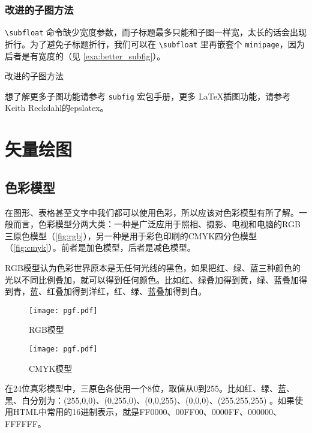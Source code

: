 \subsubsection{改进的子图方法}

\verb|\subfloat| 命令缺少宽度参数，而子标题最多只能和子图一样宽，太长的话会出现折行。为了避免子标题折行，我们可以在 \verb|\subfloat| 里再嵌套个 \texttt{minipage}，因为后者是有宽度的（见 \autoref{exa:better_subfig}）。

\begin{example}[h]
\caption{改进的子图方法}
\label{exa:better_subfig}
\end{example}

想了解更多子图功能请参考 \texttt{subfig} 宏包手册\citep{Cochran_2005}，更多 \LaTeX 插图功能，请参考Keith Reckdahl\indexReckdahl 的epslatex\citep{Reckdahl_2006}。

\section{矢量绘图}
\label{sec:draft}

\subsection{色彩模型}

在图形、表格甚至文字中我们都可以使用色彩，所以应该对色彩模型有所了解。一般而言，色彩模型分两大类：一种是广泛应用于照相、摄影、电视和电脑的RGB三原色模型（\autoref{fig:rgb}），另一种是用于彩色印刷的CMYK四分色模型（\autoref{fig:cmyk}）。前者是加色模型，后者是减色模型。

RGB模型认为色彩世界原本是无任何光线的黑色，如果把红、绿、蓝三种颜色的光以不同比例叠加，就可以得到任何颜色。比如红、绿叠加得到黄，绿、蓝叠加得到青，蓝、红叠加得到洋红，红、绿、蓝叠加得到白。

\begin{figure}[htbp]
\centering
\begin{minipage}{140pt}
\texttt{[image: pgf.pdf]}
\caption{RGB模型}
\label{fig:rgb}
\end{minipage}
\hspace{10pt}%
\begin{minipage}{140pt}
\texttt{[image: pgf.pdf]}
\caption{CMYK模型}
\label{fig:cmyk}
\end{minipage}
\end{figure}

在24位真彩模型中，三原色各使用一个8位，取值从0到255。比如红、绿、蓝、黑、白分别为：(255,0,0)、(0,255,0)、(0,0,255)、(0,0,0)、(255,255,255) 。如果使用HTML中常用的16进制表示，就是FF0000、00FF00、0000FF、000000、FFFFFF。

